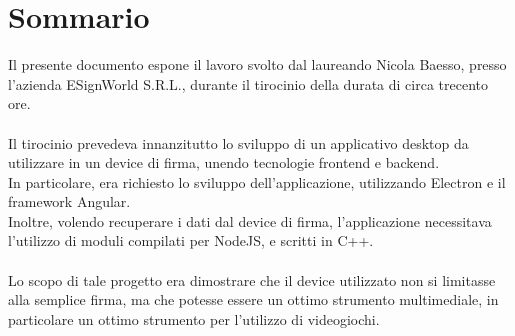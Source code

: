 \cleardoublepage
{}
{}
\begingroup
\let\clearpage\relax
\let\cleardoublepage\relax
\let\cleardoublepage\relax

\chapter*{Sommario}

Il presente documento espone il lavoro svolto dal laureando Nicola Baesso, presso l'azienda ESignWorld S.R.L., durante il tirocinio della durata di circa trecento ore.\\\\
Il tirocinio prevedeva innanzitutto lo sviluppo di un applicativo desktop da utilizzare in un device di firma, unendo tecnologie frontend e backend.\\
In particolare, era richiesto lo sviluppo dell'applicazione, utilizzando Electron e il framework Angular.\\
Inoltre, volendo recuperare i dati dal device di firma, l'applicazione necessitava l'utilizzo di moduli compilati per NodeJS, e scritti in C++.\\\\
Lo scopo di tale progetto era dimostrare che il device utilizzato non si limitasse alla semplice firma, ma che potesse essere un ottimo strumento multimediale, in particolare un ottimo strumento per l'utilizzo di videogiochi.\\




\endgroup

\vfill
